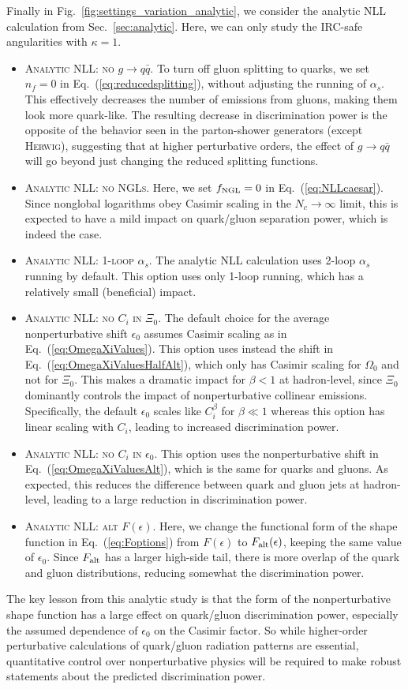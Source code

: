 \documentclass[11pt,letterpaper]{article}
\DeclareRobustCommand{\Sec}[1]{Sec.~\ref{#1}}
\DeclareRobustCommand{\Fig}[1]{Fig.~\ref{#1}}
\DeclareRobustCommand{\Eq}[1]{Eq.~(\ref{#1})}
\begin{document}
Finally in \Fig{fig:settings_variation_analytic}, we consider the analytic NLL calculation from \Sec{sec:analytic}.  Here, we can only study the IRC-safe angularities with $\kappa = 1$.  
\begin{itemize}
\item \textsc{Analytic NLL: no $g \to q\bar{q}$}.  To turn off gluon splitting to quarks, we set $n_f = 0$ in \Eq{eq:reducedsplitting}, without adjusting the running of $\alpha_s$.  This effectively decreases the number of emissions from gluons, making them look more quark-like.  The resulting decrease in discrimination power is the opposite of the behavior seen in the parton-shower generators (except \textsc{Herwig}), suggesting that at higher perturbative orders, the effect of $g \to q\bar{q}$ will go beyond just changing the reduced splitting functions.
\item \textsc{Analytic NLL: no NGLs}.  Here, we set $f_{\rm NGL} = 0$ in \Eq{eq:NLLcaesar}.  Since nonglobal logarithms obey Casimir scaling in the $N_c \to \infty$ limit, this is expected to have a mild impact on quark/gluon separation power, which is indeed the case. 
\item \textsc{Analytic NLL: 1-loop $\alpha_s$}.  The analytic NLL calculation uses 2-loop $\alpha_s$ running by default.  This option uses only 1-loop running, which has a relatively small (beneficial) impact.
\item \textsc{Analytic NLL: no $C_i$ in $\Xi_0$}.  The default choice for the average nonperturbative shift $\epsilon_0$ assumes Casimir scaling as in \Eq{eq:OmegaXiValues}.    This option uses instead the shift in \Eq{eq:OmegaXiValuesHalfAlt}, which only has Casimir scaling for $\Omega_0$ and not for $\Xi_0$.  This makes a dramatic impact for $\beta < 1$ at hadron-level, since $\Xi_0$ dominantly controls the impact of nonperturbative collinear emissions.  Specifically, the default $\epsilon_0$ scales like $C_i^\beta$ for $\beta \ll 1$ whereas this option has linear scaling with $C_i$, leading to increased discrimination power.
\item \textsc{Analytic NLL: no $C_i$ in $\epsilon_0$}.  This option uses the nonperturbative shift in \Eq{eq:OmegaXiValuesAlt}, which is the same for quarks and gluons.  As expected, this reduces the difference between quark and gluon jets at hadron-level, leading to a large reduction in discrimination power.
\item \textsc{Analytic NLL: alt $F(\epsilon)$}.  Here, we change the functional form of the shape function in \Eq{eq:Foptions} from $F(\epsilon)$ to $F_{\rm alt}(\epsilon)$, keeping the same value of $\epsilon_0$.  Since $F_{\rm alt}$ has a larger high-side tail, there is more overlap of the quark and gluon distributions, reducing somewhat the discrimination power.
\end{itemize}
The key lesson from this analytic study is that the form of the nonperturbative shape function has a large effect on quark/gluon discrimination power, especially the assumed dependence of $\epsilon_0$ on the Casimir factor.  So while higher-order perturbative calculations of quark/gluon radiation patterns are essential, quantitative control over nonperturbative physics will be required to make robust statements about the predicted discrimination power.
\end{document}
